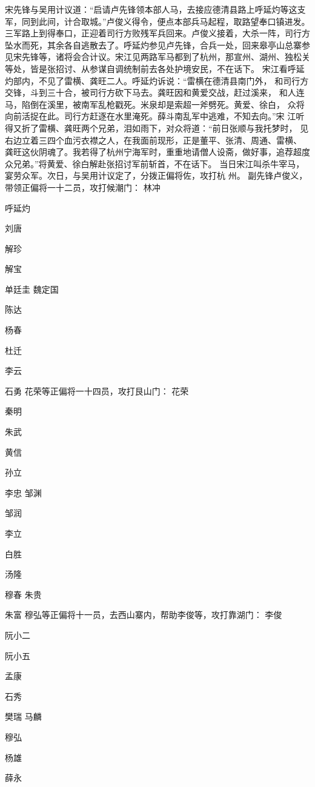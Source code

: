 宋先锋与吴用计议道：“启请卢先锋领本部人马，去接应德清县路上呼延灼等这支
军，同到此间，计合取城。”卢俊义得令，便点本部兵马起程，取路望奉口镇进发。
三军路上到得奉口，正迎着司行方败残军兵回来。卢俊义接着，大杀一阵，司行方
坠水而死，其余各自逃散去了。呼延灼参见卢先锋，合兵一处，回来皋亭山总寨参
见宋先锋等，诸将会合计议。宋江见两路军马都到了杭州，那宣州、湖州、独松关
等处，皆是张招讨、从参谋自调统制前去各处护境安民，不在话下。
宋江看呼延灼部内，不见了雷横、龚旺二人。呼延灼诉说：“雷横在德清县南门外，
和司行方交锋，斗到三十合，被司行方砍下马去。龚旺因和黄爱交战，赶过溪来，
和人连马，陷倒在溪里，被南军乱枪戳死。米泉却是索超一斧劈死。黄爱、徐白，
众将向前活捉在此。司行方赶逐在水里淹死。薛斗南乱军中逃难，不知去向。”宋
江听得又折了雷横、龚旺两个兄弟，泪如雨下，对众将道：“前日张顺与我托梦时，
见右边立着三四个血污衣襟之人，在我面前现形，正是董平、张清、周通、雷横、
龚旺这伙阴魂了。我若得了杭州宁海军时，重重地请僧人设斋，做好事，追荐超度
众兄弟。”将黄爱、徐白解赴张招讨军前斩首，不在话下。
当日宋江叫杀牛宰马，宴劳众军。次日，与吴用计议定了，分拨正偏将佐，攻打杭
州。
副先锋卢俊义，带领正偏将一十二员，攻打候潮门：
林冲

呼延灼

刘唐

解珍

解宝

单廷圭
魏定国

陈达

杨春

杜迁

李云

石勇
花荣等正偏将一十四员，攻打艮山门：
花荣

秦明

朱武

黄信

孙立

李忠
邹渊

邹润

李立

白胜

汤隆

穆春
朱贵

朱富
穆弘等正偏将十一员，去西山寨内，帮助李俊等，攻打靠湖门：
李俊

阮小二

阮小五

孟康

石秀

樊瑞
马麟

穆弘

杨雄

薛永

